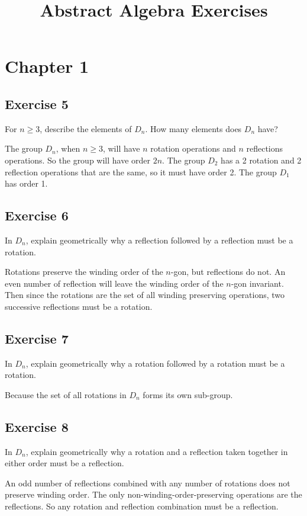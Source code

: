 \documentclass[12pt]{article}
\title{Abstract Algebra Exercises}
\begin{document}
\maketitle

\section*{Chapter 1}

\subsection*{Exercise 5}

For $n\geq 3$, describe the elements of $D_n$.  How many elements does $D_n$ have?

The group $D_n$, when $n\geq 3$, will have $n$ rotation operations and $n$ reflections operations.
So the group will have order $2n$.  The group $D_2$ has a 2 rotation and 2 reflection operations that
are the same, so it must have order 2.  The group $D_1$ has order 1.

\subsection*{Exercise 6}

In $D_n$, explain geometrically why a reflection followed by a reflection must be a rotation.

Rotations preserve the winding order of the $n$-gon, but reflections do not.  An even
number of reflection will leave the winding order of the $n$-gon invariant.  Then since the
rotations are the set of all winding preserving operations, two successive reflections
must be a rotation.

\subsection*{Exercise 7}

In $D_n$, explain geometrically why a rotation followed by a rotation must be a rotation.

Because the set of all rotations in $D_n$ forms its own sub-group.

\subsection*{Exercise 8}

In $D_n$, explain geometrically why a rotation and a reflection taken together in either order must be a reflection.

An odd number of reflections combined with any number of rotations does not preserve winding order.
The only non-winding-order-preserving operations are the reflections.  So any rotation and
reflection combination must be a reflection.
\end{document}
